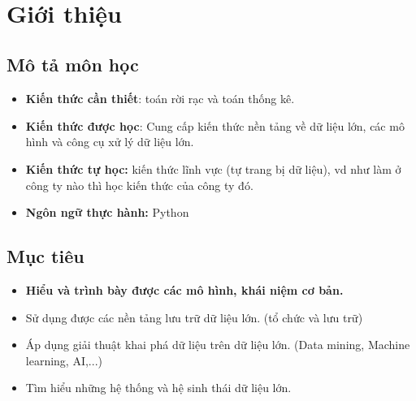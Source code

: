 


\begin{titlepage}
\bordertitle
\begin{center}
\vspace{\fill} \maintitle \\ \vspace{\fill} \bottitle
\end{center}
\end{titlepage}
\newpage
{}
\tableofcontents
\thispagestyle{empty}

\newpage
\setcounter{page}{1}
\chapter{ Giới thiệu }
\section{ Mô tả môn học }
\begin{itemize}
    \item \textbf{Kiến thức cần thiết}: toán rời rạc và toán thống kê.
    \item \textbf{Kiến thức được học}: Cung cấp kiến thức nền tảng về dữ liệu lớn, các mô hình và công cụ xử lý dữ liệu lớn.
    \item \textbf{Kiến thức tự học:} kiến thức lĩnh vực (tự trang bị dữ liệu), vd như làm ở công ty nào thì học kiến thức của công ty đó. 
    \item \textbf{Ngôn ngữ thực hành:} Python
\end{itemize}
\section{ Mục tiêu }
\begin{itemize}
    \item \textbf{Hiểu và trình bày được các mô hình, khái niệm cơ bản.}
    \item Sử dụng được các nền tảng lưu trữ dữ liệu lớn. (tổ chức và lưu trữ)
    \item Áp dụng giải thuật khai phá dữ liệu trên dữ liệu lớn. (Data mining, Machine learning, AI,...)
    \item Tìm hiểu những hệ thống và hệ sinh thái dữ liệu lớn.
\end{itemize}
